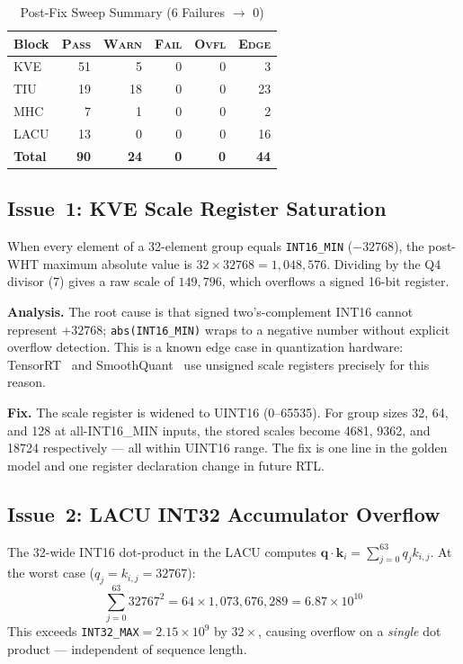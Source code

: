 \documentclass[conference]{IEEEtran}
\newcommand{\kve}{\textsc{KVE}}
\newcommand{\tiu}{\textsc{TIU}}
\newcommand{\mhc}{\textsc{MHC}}
\newcommand{\lacu}{\textsc{LACU}}
\begin{document}
\begin{table}[t]
\caption{Post-Fix Sweep Summary (6 Failures $\to$ 0)}
\label{tab:findings_after}
\centering
\begin{tabular}{lrrrrr}
\toprule
Block & \textsc{Pass} & \textsc{Warn} & \textsc{Fail} & \textsc{Ovfl} & \textsc{Edge} \\
\midrule
\kve  & 51 & 5 & 0 & 0 & 3 \\
\tiu  & 19 & 18 & 0 & 0 & 23 \\
\mhc  & 7  & 1  & 0 & 0 & 2 \\
\lacu & 13 & 0  & 0 & 0 & 16 \\
\midrule
\textbf{Total} & \textbf{90} & \textbf{24} & \textbf{0} & \textbf{0} & \textbf{44} \\
\bottomrule
\end{tabular}
\end{table}

\subsection{Issue~1: KVE Scale Register Saturation}

When every element of a 32-element group equals \texttt{INT16\_MIN}
($-32768$), the post-WHT maximum absolute value is
$32 \times 32768 = 1{,}048{,}576$. Dividing by the Q4 divisor (7)
gives a raw scale of $149{,}796$, which overflows a signed 16-bit
register.

\textbf{Analysis.} The root cause is that signed two's-complement
INT16 cannot represent $+32768$; \texttt{abs(INT16\_MIN)} wraps to
a negative number without explicit overflow detection. This is a
known edge case in quantization hardware: TensorRT~\cite{tensorrt} and
SmoothQuant~\cite{smoothquant2023} use unsigned scale registers
precisely for this reason.

\textbf{Fix.} The scale register is widened to UINT16 (0--65535).
For group sizes 32, 64, and 128 at all-INT16\_MIN inputs, the
stored scales become 4681, 9362, and 18724 respectively --- all within
UINT16 range. The fix is one line in the golden model and one register
declaration change in future RTL.

\subsection{Issue~2: LACU INT32 Accumulator Overflow}

The 32-wide INT16 dot-product in the LACU computes
$\mathbf{q} \cdot \mathbf{k}_i = \sum_{j=0}^{63} q_j k_{i,j}$.
At the worst case ($q_j = k_{i,j} = 32767$):
\[
  \sum_{j=0}^{63} 32767^2 = 64 \times 1{,}073{,}676{,}289 = 6.87 \times 10^{10}
\]
This exceeds \texttt{INT32\_MAX}$= 2.15\times 10^9$ by $32\times$,
causing overflow on a \emph{single} dot product --- independent of
sequence length.
\end{document}
